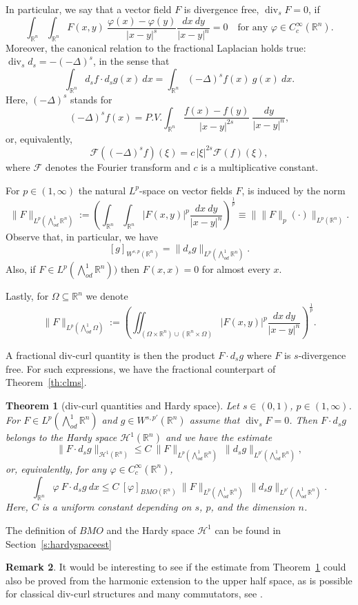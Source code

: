 \documentclass[12pt]{amsart}
\newtheorem{theorem}{Theorem}
\theoremstyle{definition}
\newtheorem{remark}[theorem]{Remark}
\newcommand{\R}{\mathbb{R}}
\newcommand{\brac}[1]{\left (#1 \right )}
\newcommand{\Ep}{\bigwedge\nolimits}
\numberwithin{theorem}{section} \numberwithin{equation}{section}
\renewcommand{\div}{\operatorname{div}}
\newcommand{\lap}{\Delta }
\begin{document}
In particular, we say that a vector field $F$ is divergence free, $\div_s F = 0$, if
\begin{equation}\label{eq:vanishing}
\int_{\R^n} \int_{\R^n} F(x,y)\ \frac{\varphi(x) -\varphi(y) }{|x-y|^s} \frac{dx\ dy}{|x-y|^n} = 0 \quad \mbox{for any $\varphi \in C_c^\infty(\R^n)$}.
\end{equation}
Moreover, the canonical relation to the fractional Laplacian holds true: $\div_s d_s = -(-\lap)^s$, in the sense that
\[
 \int_{\R^n} d_s f \cdot d_sg(x)\ dx = \int_{\R^n} (-\lap)^s f(x)\ g(x)\ dx.
\]
Here, $(-\lap)^s$ stands for 
\[
 (-\lap)^s f(x)  = P.V. \int_{\R^n} \frac{f(x)-f(y)}{|x-y|^{2s}}\ \frac{dy}{|x-y|^n},
\]
or, equivalently,
\[
 \mathcal{F} \brac{(-\lap)^s f}(\xi) = c\, |\xi|^{2s} \mathcal{F} (f)(\xi),
\]
where $\mathcal{F}$ denotes the Fourier transform and $c$ is a multiplicative constant.

For $p \in (1,\infty)$ the natural $L^p$-space  on vector fields $F$, is induced by the norm 
\[
 \|F\|_{L^p(\Ep^1_{od}\R^n)}:= \brac{\int_{\R^n}\int_{\R^n}|F(x,y)|^p \frac{dx\ dy}{|x-y|^n}}^\frac 1p \equiv \big \|\|F\|_{p}(\cdot) \big \|_{L^p(\R^n)}.
\]
% 
Observe that, in particular, we have
\[
 [g]_{W^{s,p}(\R^n)} = \|d_s g\|_{L^p(\Ep^1_{od} \R^n)}.
\]
Also, if $F \in L^p(\Ep^1_{od}\R^n))$ then $F(x,x) = 0$ for almost every $x$.

Lastly, for $\Omega\subseteq \R^n$ we denote
\[
 \|F\|_{L^p(\Ep^1_{od}\Omega)}:= \brac{\iint_{\brac{\Omega\times\R^n}\cup \brac{\R^n\times\Omega}}|F(x,y)|^p \frac{dx\ dy}{|x-y|^n}}^\frac 1p.
\]

A fractional div-curl quantity is then the product $F \cdot d_s g$ where $F$ is $s$-divergence free. For such expressions, we have the fractional counterpart of Theorem~\ref{th:clms}.
\begin{theorem}[div-curl quantities and Hardy space]\label{th:clmstypestimate}
Let $s \in (0,1)$, $p \in (1,\infty)$. For $F \in L^p(\Ep^1_{od} \R^n)$ and $g \in W^{s,p'}(\R^n)$ assume that $\div_s F = 0$. Then $F \cdot d_s g$ belongs to the Hardy space $\mathcal{H}^1(\R^n)$ and we have the estimate
\[
 \|F \cdot d_s g \|_{\mathcal{H}^1(\R^n)} \leq C\  \|F\|_{L^p(\Ep^1_{od} \R^n)}\ \|d_s g\|_{L^{p'}(\Ep^1_{od} \R^n)},
\]
or, equivalently, for any $\varphi \in C_c^\infty(\R^n)$,
\[
 \int_{\R^n} \varphi\ F \cdot d_s g\ dx \leq C\ [\varphi]_{BMO(\R^n)}\ \|F\|_{L^p(\Ep^1_{od} \R^n)}\ \|d_s g\|_{L^{p'}(\Ep^1_{od} \R^n)}.
\]
Here, $C$ is a uniform constant depending on $s$, $p$, and the dimension $n$.
\end{theorem}
The definition of $BMO$ and the Hardy space $\mathcal{H}^1$ can be found in Section~\ref{s:hardyspaceest}
\begin{remark}
It would be interesting to see if the estimate from Theorem~\ref{th:clmstypestimate} could also be proved from the harmonic extension to the upper half space, as is possible for classical div-curl structures and many commutators, see \cite{Lenzmann-Schikorra-2016}. 
\end{remark}
\end{document}
